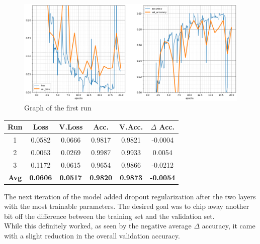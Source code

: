 \begin{figure}[H]
	\begin{center}
	\includegraphics[width=\linewidth]{Immagini/conv-drop-pool-1}
	\caption{Graph of the first run}
	\end{center}
\end{figure}
\begin{table}[H]
	\centering
	\begin{tabular}{cccccc}
		\textbf{Run} &\textbf{Loss}&\textbf{V.Loss} &\textbf{Acc.}&\textbf{V.Acc.}&\textbf{$\Delta$ Acc.} \\ \hline
		1   & 0.0582    & 0.0666    & 0.9817    & 0.9821    & -0.0004\\
		2   & 0.0063    & 0.0269    & 0.9987    & 0.9933    & 0.0054\\
		3   & 0.1172    & 0.0615    & 0.9654    & 0.9866    & -0.0212\\
		\textbf{Avg} & \textbf{0.0606}    & \textbf{0.0517}    & \textbf{0.9820}    & \textbf{0.9873}    & \textbf{-0.0054}
	\end{tabular}
\end{table}

The next iteration of the model added dropout regularization after the two layers with the most trainable parameters. The desired goal was to chip away another bit off the difference between the training set and the validation set.\\
While this definitely worked, as seen by the negative average $\Delta$ accuracy, it came with a slight reduction in the overall validation accuracy.